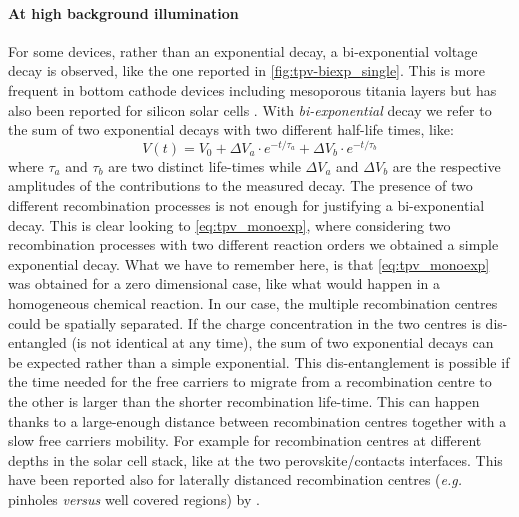 	\paragraph{At high background illumination}
	For some devices, rather than an exponential decay, a bi\hyp{}exponential voltage decay is observed, like the one reported in \cref{fig:tpv-biexp_single}.
	This is more frequent in bottom cathode devices including mesoporous titania layers \cite{Carnie2015,ORegan2015b} but has also been reported for silicon solar cells \cite{Kiermasch2018}.
	With \emph{bi\hyp{}exponential} decay we refer to the sum of two exponential decays with two different half\hyp{}life times, like:
	\begin{equation}\label{eq:tpv_biexp}
		V (t) = V_0 + \Delta V_a \cdot e^{-t/\tau_a} + \Delta V_b \cdot e^{-t/\tau_b}
	\end{equation}
	where $\tau_a$ and $\tau_b$ are two distinct life\hyp{}times while $\Delta V_a$ and $\Delta V_b$ are the respective amplitudes of the contributions to the measured decay.
	The presence of two different recombination processes is not enough for justifying a bi\hyp{}exponential decay.
	This is clear looking to \cref{eq:tpv_monoexp}, where considering two recombination processes with two different reaction orders we obtained a simple exponential decay.
	What we have to remember here, is that \cref{eq:tpv_monoexp} was obtained for a zero dimensional case, like what would happen in a homogeneous chemical reaction.
	In our case, the multiple recombination centres could be spatially separated.
	If the charge concentration in the two centres is dis\hyp{}entangled (is not identical at any time), the sum of two exponential decays can be expected rather than a simple exponential.
	This dis\hyp{}entanglement is possible if the time needed for the free carriers to migrate from a recombination centre to the other is larger than the shorter recombination life\hyp{}time.
	This can happen thanks to a large\hyp{}enough distance between recombination centres together with a slow free carriers mobility.
	For example for recombination centres at different depths in the solar cell stack, like at the two perovskite/contacts interfaces.
	This have been reported also for laterally distanced recombination centres (\textsl{e.g.} pinholes \textsl{versus} well covered regions) by .

